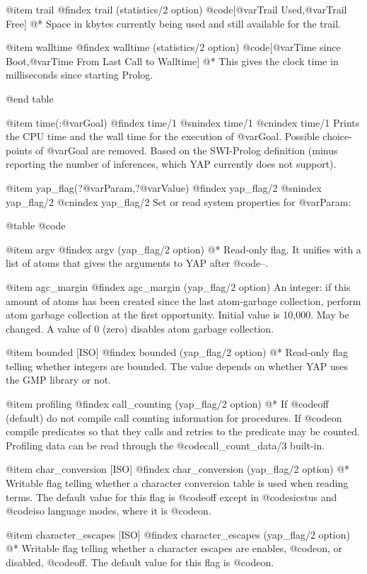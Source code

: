 {{{{{{{@item trail
@findex trail (statistics/2 option)
@code{[@var{Trail Used},@var{Trail Free}]}
@*
Space in kbytes currently being used and still available for the trail.

@item walltime
@findex walltime (statistics/2 option)
@code{[@var{Time since Boot},@var{Time From Last Call to Walltime}]}
@* 
This gives the clock time in milliseconds since starting Prolog.

@end table

@item time(:@var{Goal})
@findex time/1
@snindex time/1
@cnindex time/1
Prints the CPU time and the wall time for the execution of @var{Goal}.
Possible choice-points of @var{Goal} are removed. Based on the SWI-Prolog 
definition (minus reporting the number of inferences, which YAP currently
does not support).

@item yap_flag(?@var{Param},?@var{Value})
@findex yap_flag/2
@snindex yap_flag/2
@cnindex yap_flag/2
Set or read system properties for @var{Param}:

@table @code

@item argv
@findex argv (yap_flag/2 option)
@* Read-only flag. It unifies with a list of atoms that gives the
arguments to YAP after @code{--}.

@item agc_margin
@findex agc_margin (yap_flag/2 option)
An integer: if this amount of atoms has been created since the last
atom-garbage collection, perform atom garbage collection at the first
opportunity. Initial value is 10,000. May be changed. A value of 0
(zero) disables atom garbage collection.

@item bounded [ISO]
@findex bounded (yap_flag/2 option)
@*
Read-only flag telling whether integers are bounded. The value depends
on whether YAP uses the GMP library or not.

@item  profiling
@findex call_counting (yap_flag/2 option)
@*
If @code{off} (default) do not compile call counting information for
procedures. If @code{on} compile predicates so that they calls and
retries to the predicate may be counted. Profiling data can be read through the
@code{call_count_data/3} built-in.

@item char_conversion [ISO]
@findex  char_conversion (yap_flag/2 option)
@*
Writable flag telling whether a character conversion table is used when
reading terms. The default value for this flag is @code{off} except in
@code{sicstus} and @code{iso} language modes, where it is @code{on}.

@item character_escapes [ISO]
@findex  character_escapes (yap_flag/2 option)
@* Writable flag telling whether a character escapes are enables,
@code{on}, or disabled, @code{off}. The default value for this flag is
@code{on}.

}}}}}}}
